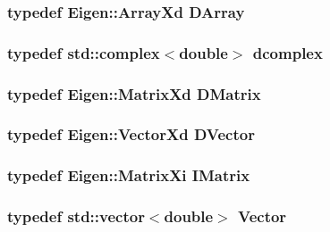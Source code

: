 \subsubsection{\setlength{\rightskip}{0pt plus 5cm}typedef Eigen::Array\-Xd \bf{DArray}}\label{types_8h_e860d112b94e13ff08981b4cb56ab127}


\subsubsection{\setlength{\rightskip}{0pt plus 5cm}typedef std::complex$<$double$>$ \bf{dcomplex}}\label{types_8h_9cd6246c3665bdbc2377b9c902f311e3}


\subsubsection{\setlength{\rightskip}{0pt plus 5cm}typedef Eigen::Matrix\-Xd \bf{DMatrix}}\label{types_8h_4c52c4c12187e6b425a9d4717b825d69}


\subsubsection{\setlength{\rightskip}{0pt plus 5cm}typedef Eigen::Vector\-Xd \bf{DVector}}\label{types_8h_925211c73e1180fdbac37dabf2023e6d}


\subsubsection{\setlength{\rightskip}{0pt plus 5cm}typedef Eigen::Matrix\-Xi \bf{IMatrix}}\label{types_8h_212ba5163db4c5e6b818b9cffef24157}


\subsubsection{\setlength{\rightskip}{0pt plus 5cm}typedef std::vector$<$double$>$ \bf{Vector}}\label{types_8h_7926b480347b577f7cab668c2f345f29}



